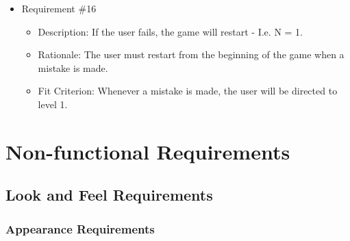 \documentclass[12pt, titlepage]{article}
\begin{document}
\begin{itemize}
\item Requirement \#16
\begin{itemize}
\item Description: If the user fails, the game will restart - I.e. N = 1.
\item Rationale: The user must restart from the beginning of the game when a mistake is made.
\item Fit Criterion: Whenever a mistake is made, the user will be directed to level 1.
\end{itemize}

\end{itemize}


\section{Non-functional Requirements}
\subsection{Look and Feel Requirements}
\subsubsection{Appearance Requirements}
\end{document}
